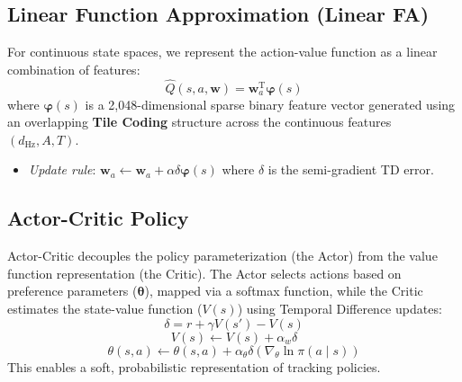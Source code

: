 \documentclass[12pt,a4paper]{article}
\begin{document}
\subsection{Linear Function Approximation (Linear FA)}
For continuous state spaces, we represent the action-value function as a linear combination of features:
\begin{equation}
    \hat{Q}(s, a, \mathbf{w}) = \mathbf{w}_a^{\mathrm{T}} \boldsymbol{\varphi}(s)
\end{equation}
where $\boldsymbol{\varphi}(s)$ is a 2,048-dimensional sparse binary feature vector generated using an overlapping \textbf{Tile Coding} structure across the continuous features $(d_{\text{Hz}}, A, T)$.
\begin{itemize}
    \item \textit{Update rule}: $\mathbf{w}_a \leftarrow \mathbf{w}_a + \alpha \delta \boldsymbol{\varphi}(s)$ where $\delta$ is the semi-gradient TD error.
\end{itemize}

\subsection{Actor-Critic Policy}
Actor-Critic decouples the policy parameterization (the Actor) from the value function representation (the Critic). The Actor selects actions based on preference parameters ($\boldsymbol{\theta}$), mapped via a softmax function, while the Critic estimates the state-value function ($V(s)$) using Temporal Difference updates:
\begin{equation}
    \delta = r + \gamma V(s') - V(s)
\end{equation}
\begin{equation}
    V(s) \leftarrow V(s) + \alpha_w \delta
\end{equation}
\begin{equation}
    \theta(s, a) \leftarrow \theta(s, a) + \alpha_{\theta} \delta \left( \nabla_{\theta} \ln \pi(a \mid s) \right)
\end{equation}
This enables a soft, probabilistic representation of tracking policies.
\end{document}
